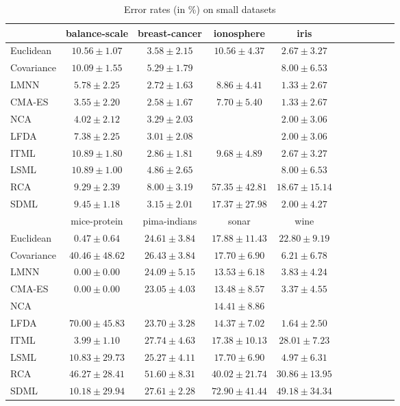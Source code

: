 \begin{table}[ht] \centering
\begin{tabular}{lcccccccccc}
\toprule


& \multicolumn{1}{c}{balance-scale} & \multicolumn{1}{c}{breast-cancer} & \multicolumn{1}{c}{ionosphere} & \multicolumn{1}{c}{iris} \\ 
\midrule
Euclidean & $10.56\pm1.07$ & $3.58\pm2.15$ & $10.56\pm4.37$ & $2.67\pm3.27$ \\
Covariance & $10.09\pm1.55$ & $5.29\pm1.79$ &  & $8.00\pm6.53$ \\
LMNN & $5.78\pm2.25$ & $2.72\pm1.63$ & $8.86\pm4.41$ & $\bm{1.33\pm2.67}$ \\
CMA-ES & $\bm{3.55\pm2.20}$ & $\bm{2.58\pm1.67}$ & $\bm{7.70\pm5.40}$ & $\bm{1.33\pm2.67}$ \\
NCA & $4.02\pm2.12$ & $3.29\pm2.03$ &  & $2.00\pm3.06$ \\
LFDA & $7.38\pm2.25$ & $3.01\pm2.08$ &  & $2.00\pm3.06$ \\
ITML & $10.89\pm1.80$ & $2.86\pm1.81$ & $9.68\pm4.89$ & $2.67\pm3.27$ \\
LSML & $10.89\pm1.00$ & $4.86\pm2.65$ &  & $8.00\pm6.53$ \\
RCA & $9.29\pm2.39$ & $8.00\pm3.19$ & $57.35\pm42.81$ & $18.67\pm15.14$ \\
SDML & $9.45\pm1.18$ & $3.15\pm2.01$ & $17.37\pm27.98$ & $2.00\pm4.27$ \\
\midrule
& \multicolumn{1}{c}{mice-protein} & \multicolumn{1}{c}{pima-indians} & \multicolumn{1}{c}{sonar} & \multicolumn{1}{c}{wine} \\ 
\midrule
Euclidean & $0.47\pm0.64$ & $24.61\pm3.84$ & $17.88\pm11.43$ & $22.80\pm9.19$ \\
Covariance & $40.46\pm48.62$ & $26.43\pm3.84$ & $17.70\pm6.90$ & $6.21\pm6.78$ \\
LMNN & $\bm{0.00\pm0.00}$ & $24.09\pm5.15$ & $13.53\pm6.18$ & $3.83\pm4.24$ \\
CMA-ES & $\bm{0.00\pm0.00}$ & $\bm{23.05\pm4.03}$ & $\bm{13.48\pm8.57}$ & $3.37\pm4.55$ \\
NCA &  &  & $14.41\pm8.86$ &  \\
LFDA & $70.00\pm45.83$ & $23.70\pm3.28$ & $14.37\pm7.02$ & $\bm{1.64\pm2.50}$ \\
ITML & $3.99\pm1.10$ & $27.74\pm4.63$ & $17.38\pm10.13$ & $28.01\pm7.23$ \\
LSML & $10.83\pm29.73$ & $25.27\pm4.11$ & $17.70\pm6.90$ & $4.97\pm6.31$ \\
RCA & $46.27\pm28.41$ & $51.60\pm8.31$ & $40.02\pm21.74$ & $30.86\pm13.95$ \\
SDML & $10.18\pm29.94$ & $27.61\pm2.28$ & $72.90\pm41.44$ & $49.18\pm34.34$ \\


\bottomrule
\end{tabular} %
\caption{Error rates (in \%) on small datasets} \label{tab:errors-small}
\end{table}
